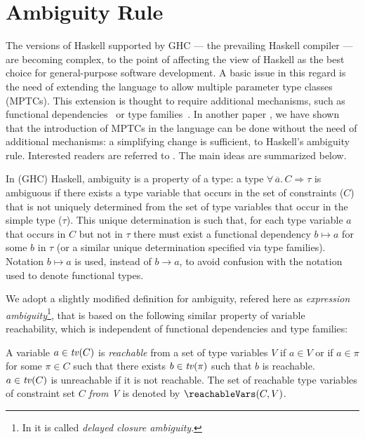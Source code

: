 \section{Ambiguity Rule}
\label{sec:ambiguity}

The versions of Haskell supported by GHC \cite{GHC} --- the prevailing
Haskell compiler --- are becoming complex, to the point of affecting
the view of Haskell as the best choice for general-purpose software
development. A basic issue in this regard is the need of extending the
language to allow multiple parameter type classes (MPTCs). This
extension is thought to require additional mechanisms, such as
functional dependencies~\cite{Jones2008} or type families~\cite{Chakravarty2005}. In another paper
\cite{JBCS-Ambiguity-and-constrained-polymorphism}, we have shown that
the introduction of MPTCs in the language can be done without the need
of additional mechanisms: a simplifying change is sufficient, to
Haskell's ambiguity rule. Interested readers are referred to
\cite{JBCS-Ambiguity-and-constrained-polymorphism}. The main ideas are
summarized below.

In (GHC) Haskell, ambiguity is a property of a type: a type
$\forall\,\overline{a}.\,C \Rightarrow \tau$ is ambiguous if there
exists a type variable that occurs in the set of constraints ($C$)
that is not uniquely determined from the set of type variables that
occur in the simple type ($\tau$). This unique determination is such
that, for each type variable $a$ that occurs in $C$ but not in $\tau$
there must exist a functional dependency $b \mapsto a$ for some $b$ in
$\tau$ (or a similar unique determination specified via type
families). Notation $b \mapsto a$ is used, instead of $b \rightarrow
a$, to avoid confusion with the notation used to denote functional
types.

We adopt a slightly modified definition for ambiguity, refered here as
{\em expression ambiguity\/}\footnote{In
  \cite{JBCS-Ambiguity-and-constrained-polymorphism} it is called {\em
    delayed closure ambiguity\/}.}, that is based on the following
similar property of variable reachability, which is independent of
functional dependencies and type families:

\begin{Definition}

A variable $a\in \text{\it tv\/}(C)$ is {\em reachable} from a set of type
variables $V$ if $a\in V$ or if $a\in \pi$ for some $\pi\in C$ such
that there exists $b\in \text{\it tv\/}(\pi)$ such that $b$ is reachable. $a\in
\text{\it tv\/}(C)$ is unreachable if it is not reachable. The set of reachable
type variables of constraint set $C$ {\em from V\/} is denoted by
$\reachableVars(C,V)$.

\label{def:reachable}
\end{Definition}

